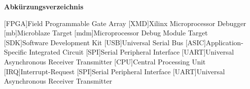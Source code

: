 
{\textbf{Abkürzungsverzeichnis}}

\begin{acronym}[Bash]
 [FPGA]{Field Programmable Gate Array}
 [XMD]{Xilinx Microprocessor Debugger}
 [mb]{Microblaze Target}
 [mdm]{Microprocessor Debug Module Target}
 [SDK]{Software Development Kit}
 [USB]{Universal Serial Bus}
 [ASIC]{Application-Specific Integrated Circuit}
 [SPI]{Serial Peripheral Interface}
 [UART]{Universal Asynchronous Receiver Transmitter}
 [CPU]{Central Processing Unit}
 [IRQ]{Interrupt-Request}
 [SPI]{Serial Peripheral Interface}
 [UART]{Universal Asynchronous Receiver Transmitter}
\end{acronym}
